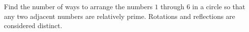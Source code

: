 Find the number of ways to arrange the numbers $1$ through $6$ in a circle so that any two adjacent numbers are relatively prime. Rotations and reflections are considered distinct.
